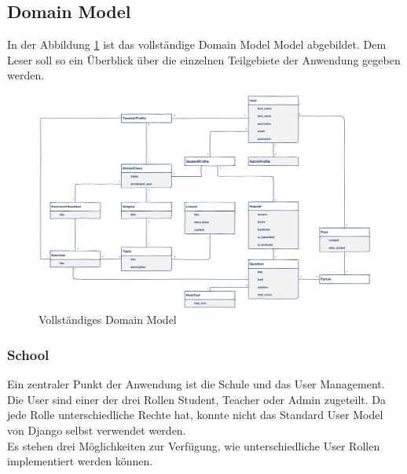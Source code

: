 \subsection{Domain Model}
In der Abbildung \ref{fig:domain_model_full} ist das vollständige Domain Model Model abgebildet. Dem Leser soll so ein Überblick über die einzelnen Teilgebiete der Anwendung gegeben werden.

\begin{landscape}

\begin{minipage}{\textwidth}
	\begin{figure}[H]
	\begin{center}
		\includegraphics[width=1.4\textwidth, keepaspectratio]{images/domain_model_full.png}
  		\caption{Vollständiges Domain Model}
		\label{fig:domain_model_full}
	\end{center}
	\end{figure}
\end{minipage}

\end{landscape}

\subsubsection*{School}
Ein zentraler Punkt der Anwendung ist die Schule und das User Management. Die User sind einer der drei Rollen Student, Teacher oder Admin zugeteilt. Da jede Rolle unterschiedliche Rechte hat, konnte nicht das Standard User Model von Django selbst verwendet werden. \\
Es stehen drei Möglichkeiten zur Verfügung, wie unterschiedliche User Rollen implementiert werden können.

